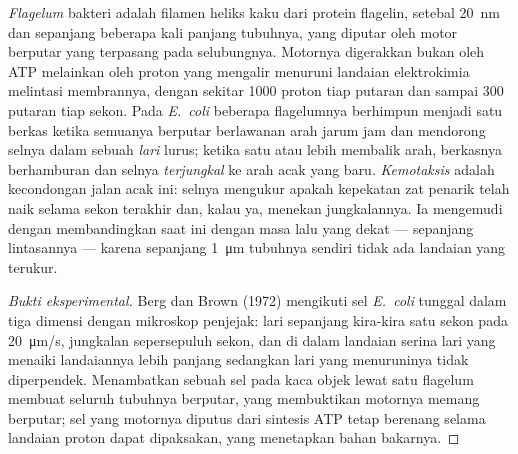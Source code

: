 \begin{proposition}\label{prop:b2:unicellular-diversity:flagellum}
\emph{Flagelum} bakteri adalah filamen heliks kaku dari protein
flagelin, setebal \qty{20}{nm} dan sepanjang beberapa kali panjang
tubuhnya, yang diputar oleh motor berputar yang terpasang pada
selubungnya. Motornya digerakkan bukan oleh ATP melainkan oleh proton
yang mengalir menuruni landaian elektrokimia melintasi membrannya,
dengan sekitar \num{1000} proton tiap putaran dan sampai \num{300}
putaran tiap sekon. Pada \emph{E.~coli} beberapa flagelumnya berhimpun
menjadi satu berkas ketika semuanya berputar berlawanan arah jarum jam
dan mendorong selnya dalam sebuah \emph{lari} lurus; ketika satu atau
lebih membalik arah, berkasnya berhamburan dan selnya
\emph{terjungkal} ke arah acak yang baru. \emph{Kemotaksis} adalah
kecondongan jalan acak ini: selnya mengukur apakah kepekatan zat
penarik telah naik selama sekon terakhir dan, kalau ya, menekan
jungkalannya. Ia mengemudi dengan membandingkan saat ini dengan masa
lalu yang dekat --- sepanjang lintasannya --- karena sepanjang
\qty{1}{\micro m} tubuhnya sendiri tidak ada landaian yang terukur.
\end{proposition}
\begin{proof}[Bukti eksperimental]
Berg dan Brown (1972) mengikuti sel \emph{E.~coli} tunggal dalam tiga
dimensi dengan mikroskop penjejak: lari sepanjang kira-kira satu sekon
pada \qty{20}{\micro m/s}, jungkalan sepersepuluh sekon, dan di dalam
landaian serina lari yang menaiki landaiannya lebih panjang sedangkan
lari yang menuruninya tidak diperpendek. Menambatkan sebuah sel pada
kaca objek lewat satu flagelum membuat seluruh tubuhnya berputar, yang
membuktikan motornya memang berputar; sel yang motornya diputus dari
sintesis ATP tetap berenang selama landaian proton dapat dipaksakan,
yang menetapkan bahan bakarnya.
\end{proof}

